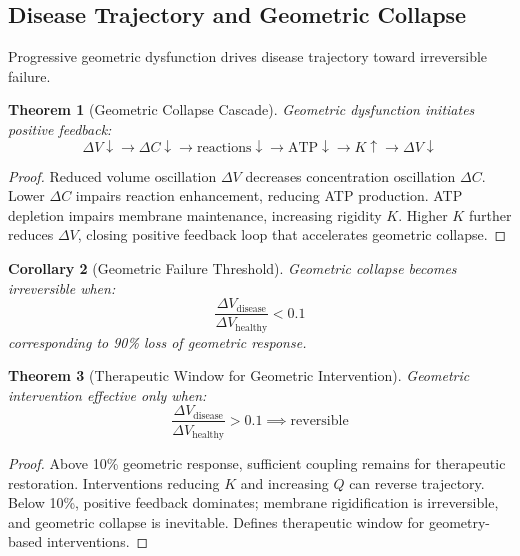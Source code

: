 \documentclass[11pt,twocolumn,a4paper]{article}
\newtheorem{theorem}{Theorem}[section]
\newtheorem{corollary}[theorem]{Corollary}
\theoremstyle{definition}
\theoremstyle{remark}
\begin{document}
\subsection{Disease Trajectory and Geometric Collapse}

Progressive geometric dysfunction drives disease trajectory toward irreversible failure.

\begin{theorem}[Geometric Collapse Cascade]
\label{thm:geometric_collapse}
Geometric dysfunction initiates positive feedback:
\begin{equation}
\Delta V \downarrow \to \Delta C \downarrow \to \text{reactions} \downarrow \to \text{ATP} \downarrow \to K \uparrow \to \Delta V \downarrow
\end{equation}
\end{theorem}

\begin{proof}
Reduced volume oscillation $\Delta V$ decreases concentration oscillation $\Delta C$. Lower $\Delta C$ impairs reaction enhancement, reducing ATP production. ATP depletion impairs membrane maintenance, increasing rigidity $K$. Higher $K$ further reduces $\Delta V$, closing positive feedback loop that accelerates geometric collapse.
\end{proof}

\begin{corollary}[Geometric Failure Threshold]
\label{cor:geometric_threshold}
Geometric collapse becomes irreversible when:
\begin{equation}
\frac{\Delta V_{\text{disease}}}{\Delta V_{\text{healthy}}} < 0.1
\end{equation}
corresponding to 90\% loss of geometric response.
\end{corollary}

\begin{theorem}[Therapeutic Window for Geometric Intervention]
\label{thm:therapeutic_window_geometric}
Geometric intervention effective only when:
\begin{equation}
\frac{\Delta V_{\text{disease}}}{\Delta V_{\text{healthy}}} > 0.1 \implies \text{reversible}
\end{equation}
\end{theorem}

\begin{proof}
Above 10\% geometric response, sufficient coupling remains for therapeutic restoration. Interventions reducing $K$ and increasing $Q$ can reverse trajectory. Below 10\%, positive feedback dominates; membrane rigidification is irreversible, and geometric collapse is inevitable. Defines therapeutic window for geometry-based interventions.
\end{proof}
\end{document}
